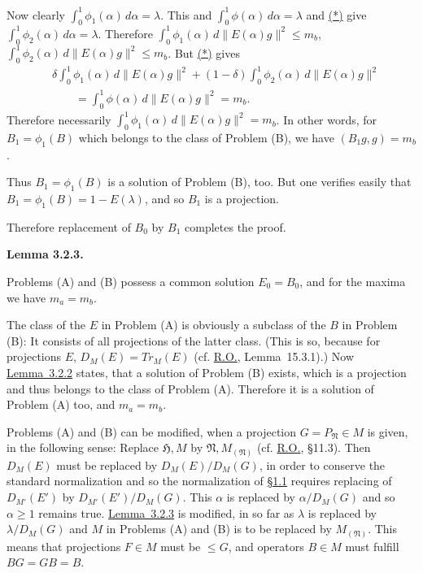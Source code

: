 \documentclass[twoside,leqno]{article}
\newcommand{\TrM}{Tr_M}
\newcommand{\RO}{\href{https://doi.org/10.2307/1968693}{R.O.}}
\newcommand{\SectionRef}[1]{\hyperlink{sec:#1}{\S#1}}
\newcommand{\StatementTarget}[1]{\phantomsection\hypertarget{stmt:#1}{}}
\newcommand{\StatementRef}[2]{\hyperlink{stmt:#1}{#2}}
\newcommand{\EquationRef}[2]{\hyperlink{eq:#1}{#2}}
\newenvironment{statement}[2]{%
  \par\medskip
  \noindent\StatementTarget{#1}\hspace*{\parindent}\textbf{#2.}\ \itshape\ignorespaces
}{\par}
\begin{document}
Now clearly $\int_0^1\phi_1(\alpha)\,d\alpha=\lambda$. This and
$\int_0^1\phi(\alpha)\,d\alpha=\lambda$ and
\EquationRef{3.2.star}{(*)} give
$\int_0^1\phi_2(\alpha)\,d\alpha=\lambda$. Therefore
$\int_0^1\phi_1(\alpha)\,d\lVert E(\alpha)g\rVert^2\leq m_b$,
$\int_0^1\phi_2(\alpha)\,d\lVert E(\alpha)g\rVert^2\leq m_b$.
But \EquationRef{3.2.star}{(*)} gives
\begin{align*}
 &\delta\int_0^1\phi_1(\alpha)\,d\lVert E(\alpha)g\rVert^2
 +(1-\delta)\int_0^1\phi_2(\alpha)\,d\lVert E(\alpha)g\rVert^2\\
 &\qquad=
 \int_0^1\phi(\alpha)\,d\lVert E(\alpha)g\rVert^2=m_b.
\end{align*}
Therefore necessarily
$\int_0^1\phi_1(\alpha)\,d\lVert E(\alpha)g\rVert^2=m_b$.
In other words, for $B_1=\phi_1(B)$ which belongs to the class of Problem
(B), we have $(B_1g,g)=m_b$.

Thus $B_1=\phi_1(B)$ is a solution of Problem (B), too. But one verifies
easily that $B_1=\phi_1(B)=1-E(\lambda)$, and so $B_1$ is a projection.

Therefore replacement of $B_0$ by $B_1$ completes the proof.

\begin{statement}{lemma:3.2.3}{Lemma 3.2.3}
Problems (A) and (B) possess a common solution $E_0=B_0$, and for the
maxima we have $m_a=m_b$.
\end{statement}

The class of the $E$ in Problem (A) is obviously a subclass of the $B$ in
Problem (B): It consists of all projections of the latter class. (This is so,
because for projections $E$, $D_M(E)=\TrM(E)$
(cf. \RO{}, Lemma~15.3.1).) Now
\StatementRef{lemma:3.2.2}{Lemma~3.2.2} states, that a solution of Problem
(B) exists, which is a projection and thus belongs to the class of Problem
(A). Therefore it is a solution of Problem (A) too, and $m_a=m_b$.

Problems (A) and (B) can be modified, when a projection
$G=P_{\mathfrak N}\in M$ is given, in the following sense: Replace
$\mathfrak H,M$ by $\mathfrak N,M_{(\mathfrak N)}$
(cf. \RO{}, \S11.3). Then $D_M(E)$ must be replaced by
$D_M(E)/D_M(G)$, in order to conserve the standard normalization and so
the normalization of \SectionRef{1.1} requires replacing of
$D_{M'}(E')$ by $D_{M'}(E')/D_M(G)$. This $\alpha$ is replaced by
$\alpha/D_M(G)$ and so $\alpha\geq1$ remains true.
\StatementRef{lemma:3.2.3}{Lemma~3.2.3} is modified, in so far as
$\lambda$ is replaced by $\lambda/D_M(G)$ and $M$ in Problems (A) and (B)
is to be replaced by $M_{(\mathfrak N)}$. This means that projections
$F\in M$ must be $\leq G$, and operators $B\in M$ must fulfill
$BG=GB=B$.
\end{document}

